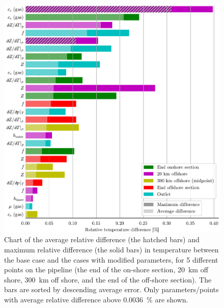 
\begin{figure}[!p]%
    \centering%
    \includegraphics{figures/barchart_all_temperature_absolute.pdf}%
    \caption{%
        Chart of the average relative difference (the hatched bars) and maximum relative difference (the solid bars) in temperature between the base case and the cases with modified parameters, for 5 different points on the pipeline (the end of the on-shore section, \SI{20}{\kilo\meter} off shore, \SI{300}{\kilo\meter} off shore, and the end of the off-shore section). The bars are sorted by descending average error. 
        Only parameters/points with average relative difference above \SI{0.0036}{\percent} are shown.%
        \label{fig:temperatureBarChart}%
    }%
\end{figure}%

